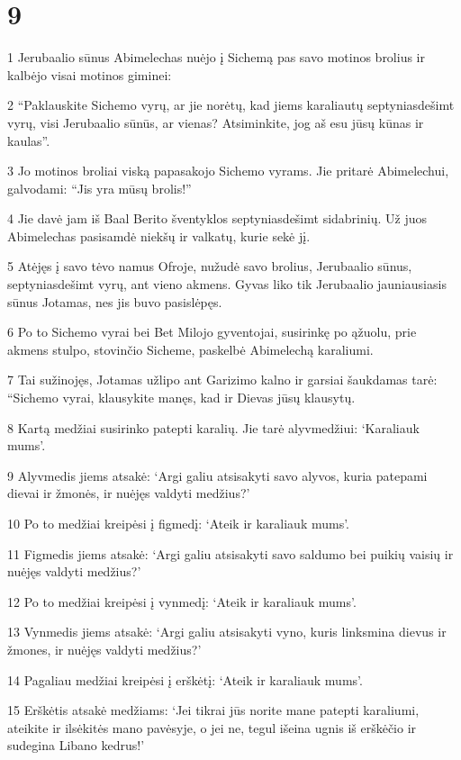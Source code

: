 \chapter{9}

\par 1 Jerubaalio sūnus Abimelechas nuėjo į Sichemą pas savo motinos brolius ir kalbėjo visai motinos giminei: 
\par 2 “Paklauskite Sichemo vyrų, ar jie norėtų, kad jiems karaliautų septyniasdešimt vyrų, visi Jerubaalio sūnūs, ar vienas? Atsiminkite, jog aš esu jūsų kūnas ir kaulas”. 
\par 3 Jo motinos broliai viską papasakojo Sichemo vyrams. Jie pritarė Abimelechui, galvodami: “Jis yra mūsų brolis!” 
\par 4 Jie davė jam iš Baal Berito šventyklos septyniasdešimt sidabrinių. Už juos Abimelechas pasisamdė niekšų ir valkatų, kurie sekė jį. 
\par 5 Atėjęs į savo tėvo namus Ofroje, nužudė savo brolius, Jerubaalio sūnus, septyniasdešimt vyrų, ant vieno akmens. Gyvas liko tik Jerubaalio jauniausiasis sūnus Jotamas, nes jis buvo pasislėpęs. 
\par 6 Po to Sichemo vyrai bei Bet Milojo gyventojai, susirinkę po ąžuolu, prie akmens stulpo, stovinčio Sicheme, paskelbė Abimelechą karaliumi. 
\par 7 Tai sužinojęs, Jotamas užlipo ant Garizimo kalno ir garsiai šaukdamas tarė: “Sichemo vyrai, klausykite manęs, kad ir Dievas jūsų klausytų. 
\par 8 Kartą medžiai susirinko patepti karalių. Jie tarė alyvmedžiui: ‘Karaliauk mums’. 
\par 9 Alyvmedis jiems atsakė: ‘Argi galiu atsisakyti savo alyvos, kuria patepami dievai ir žmonės, ir nuėjęs valdyti medžius?’ 
\par 10 Po to medžiai kreipėsi į figmedį: ‘Ateik ir karaliauk mums’. 
\par 11 Figmedis jiems atsakė: ‘Argi galiu atsisakyti savo saldumo bei puikių vaisių ir nuėjęs valdyti medžius?’ 
\par 12 Po to medžiai kreipėsi į vynmedį: ‘Ateik ir karaliauk mums’. 
\par 13 Vynmedis jiems atsakė: ‘Argi galiu atsisakyti vyno, kuris linksmina dievus ir žmones, ir nuėjęs valdyti medžius?’ 
\par 14 Pagaliau medžiai kreipėsi į erškėtį: ‘Ateik ir karaliauk mums’. 
\par 15 Erškėtis atsakė medžiams: ‘Jei tikrai jūs norite mane patepti karaliumi, ateikite ir ilsėkitės mano pavėsyje, o jei ne, tegul išeina ugnis iš erškėčio ir sudegina Libano kedrus!’ 
